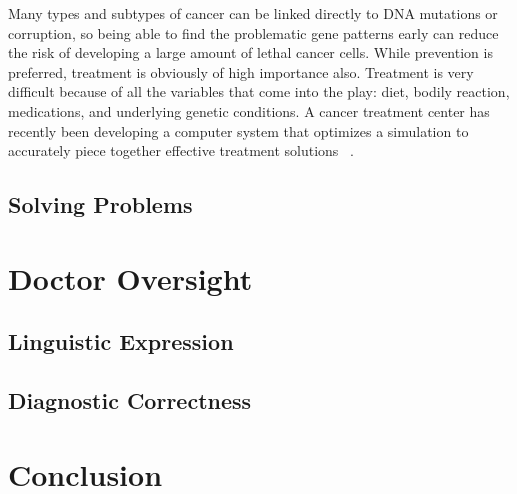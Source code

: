 \documentclass[11pt]{article}
\newcommand{\tab}{\hspace*{2em}}
\begin{document}
\begin{doublespace}
\tab Many types and subtypes of cancer can be linked directly to DNA mutations or corruption, so being able to find the
problematic gene patterns early can reduce the risk of developing a large amount of lethal cancer cells. While prevention
is preferred, treatment is obviously of high importance also. Treatment is very difficult because of all the variables that 
come into the play: diet, bodily reaction, medications, and underlying genetic conditions. A cancer treatment center has 
recently been developing a computer system that optimizes a simulation to accurately piece together effective treatment 
solutions ~\cite{Baesler:2001:HIM:564124.564329}. 

\subsection{Solving Problems}

\tab 

\section{Doctor Oversight}

\tab 

\subsection{Linguistic Expression}

\tab 

\subsection{Diagnostic Correctness}

\tab 

\section{Conclusion}

\pagebreak


\end{doublespace}

\nocite{*}



\end{document}
